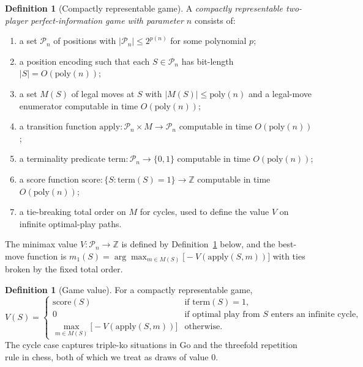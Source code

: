 \documentclass[11pt,a4paper]{amsart}
\theoremstyle{plain}
\theoremstyle{definition}
\newtheorem{definition}[theorem]{Definition}
\theoremstyle{remark}
\newcommand{\Apply}{\mathrm{apply}}
\newcommand{\score}{\mathrm{score}}
\newcommand{\poly}{\mathrm{poly}}
\begin{document}
\begin{definition}[Compactly representable game]
\label{def:framework}
A \emph{compactly representable two-player perfect-information game
with parameter $n$} consists of:
\begin{enumerate}[label=(\roman*),nosep]
  \item a set $\mathcal{P}_n$ of positions with $|\mathcal{P}_n| \leq
        2^{p(n)}$ for some polynomial $p$;
  \item a position encoding such that each $S \in \mathcal{P}_n$ has
        bit-length $|S| = O(\poly(n))$;
  \item a set $M(S)$ of legal moves at $S$ with $|M(S)| \leq \poly(n)$
        and a legal-move enumerator computable in time $O(\poly(n))$;
  \item a transition function $\Apply \colon \mathcal{P}_n \times M
        \to \mathcal{P}_n$ computable in time $O(\poly(n))$;
  \item a terminality predicate $\mathrm{term} \colon \mathcal{P}_n \to
        \{0, 1\}$ computable in time $O(\poly(n))$;
  \item a score function $\score \colon \{S : \mathrm{term}(S) = 1\}
        \to \mathbb{Z}$ computable in time $O(\poly(n))$;
  \item a tie-breaking total order on $M$ for cycles, used to define
        the value $V$ on infinite optimal-play paths.
\end{enumerate}
The minimax value $V \colon \mathcal{P}_n \to \mathbb{Z}$ is defined
by Definition~\ref{def:V} below, and the best-move function is
$m_1(S) = \arg\max_{m \in M(S)} \bigl[-V(\Apply(S, m))\bigr]$ with
ties broken by the fixed total order.
\end{definition}

\begin{definition}[Game value]
\label{def:V}
For a compactly representable game,
\[
  V(S) = \begin{cases}
    \score(S) & \text{if } \mathrm{term}(S) = 1, \\
    0 & \text{if optimal play from $S$ enters an infinite cycle,} \\
    \displaystyle\max_{m \in M(S)} \bigl[-V(\Apply(S, m))\bigr]
      & \text{otherwise.}
  \end{cases}
\]
The cycle case captures triple-ko situations in Go and the threefold
repetition rule in chess, both of which we treat as draws of value $0$.
\end{definition}
\end{document}
